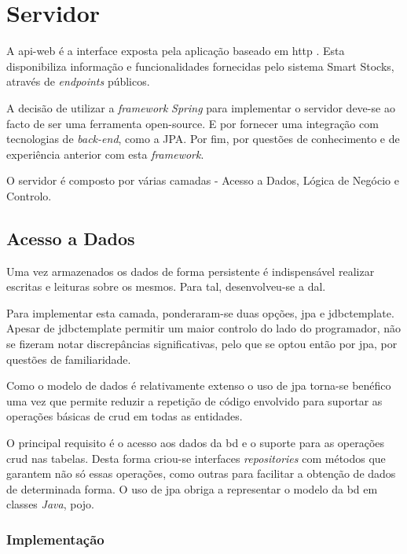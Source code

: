 \section{Servidor}\label{sec42}

A \gls{api-web} é a interface exposta pela aplicação baseado em \acrfull{http} \cite{RFC7231:http}. Esta disponibiliza informação e funcionalidades fornecidas pelo sistema Smart Stocks, através de \textit{endpoints} públicos.

A decisão de utilizar a \textit{framework} \textit{Spring} para implementar o servidor deve-se ao facto de ser uma ferramenta \gls{open-source}. E por fornecer uma integração com tecnologias de \textit{back-end}, como a JPA. Por fim, por questões de conhecimento e de experiência anterior com esta \textit{framework}.

O servidor é composto por várias camadas - Acesso a Dados, Lógica de Negócio e Controlo.

%
%
\subsection{Acesso a Dados}\label{subsec421}

Uma vez armazenados os dados de forma persistente é indispensável realizar escritas e leituras sobre os mesmos. Para tal, desenvolveu-se a \acrfull{dal}. 

Para implementar esta camada, ponderaram-se duas opções, \gls{jpa} e \gls{jdbctemplate}. Apesar de \acrshort{jdbctemplate} permitir um maior controlo do lado do programador, não se fizeram notar discrepâncias significativas, pelo que se optou então por \acrshort{jpa}, por questões de familiaridade.

Como o modelo de dados é relativamente extenso o uso de \acrshort{jpa} torna-se benéfico uma vez que permite reduzir a repetição de código envolvido para suportar as operações básicas de \acrfull{crud} em todas as entidades. 

O principal requisito é o acesso aos dados da \acrshort{bd} e o suporte para as operações \acrshort{crud} nas tabelas. Desta forma criou-se interfaces \textit{repositories} com métodos que garantem não só essas operações, como outras para facilitar a obtenção de dados de determinada forma. O uso de \acrshort{jpa} obriga a representar o modelo da \acrshort{bd} em classes \textit{Java}, \acrfull{pojo}.

\subsubsection{Implementação}\label{subsubsec4211}

